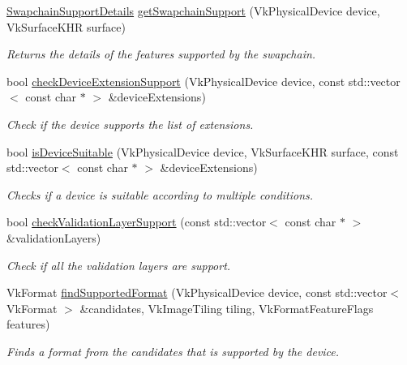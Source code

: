 \begin{DoxyCompactItemize}
\hyperlink{structblaze_1_1util_1_1SwapchainSupportDetails}{Swapchain\+Support\+Details} \hyperlink{namespaceblaze_1_1util_a11dc99b58ff4a58b45175e005acbf406}{get\+Swapchain\+Support} (Vk\+Physical\+Device device, Vk\+Surface\+K\+HR surface)
\begin{DoxyCompactList}\small\item\em Returns the details of the features supported by the swapchain. \end{DoxyCompactList}\item 
bool \hyperlink{namespaceblaze_1_1util_aba6d1d4fa38d54444eb861c08919af34}{check\+Device\+Extension\+Support} (Vk\+Physical\+Device device, const std\+::vector$<$ const char $\ast$ $>$ \&device\+Extensions)
\begin{DoxyCompactList}\small\item\em Check if the device supports the list of extensions. \end{DoxyCompactList}\item 
bool \hyperlink{namespaceblaze_1_1util_a084200da1446d1dabeb9b83eaf43dcb8}{is\+Device\+Suitable} (Vk\+Physical\+Device device, Vk\+Surface\+K\+HR surface, const std\+::vector$<$ const char $\ast$ $>$ \&device\+Extensions)
\begin{DoxyCompactList}\small\item\em Checks if a device is suitable according to multiple conditions. \end{DoxyCompactList}\item 
bool \hyperlink{namespaceblaze_1_1util_a84a8343ca8455d39e1d2cfacf1c23ac2}{check\+Validation\+Layer\+Support} (const std\+::vector$<$ const char $\ast$ $>$ \&validation\+Layers)
\begin{DoxyCompactList}\small\item\em Check if all the validation layers are support. \end{DoxyCompactList}\item 
Vk\+Format \hyperlink{namespaceblaze_1_1util_ab5bcba41a9c9ae6ea4b4673a64f67a23}{find\+Supported\+Format} (Vk\+Physical\+Device device, const std\+::vector$<$ Vk\+Format $>$ \&candidates, Vk\+Image\+Tiling tiling, Vk\+Format\+Feature\+Flags features)
\begin{DoxyCompactList}\small\item\em Finds a format from the candidates that is supported by the device. \end{DoxyCompactList}\item 
\mbox{\label{namespaceblaze_1_1util_a3fbca2ac1cf07d621cfb3316328dbbaa}} 

\end{DoxyCompactItemize}

